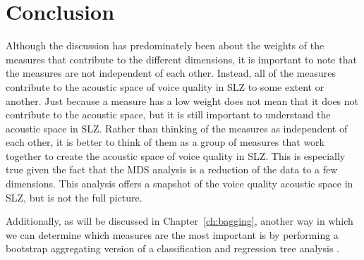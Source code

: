 \section{Conclusion} \label{sec:acousticlandscape:conclusion}

Although the discussion has predominately been about the weights of the measures that contribute to the different dimensions, it is important to note that the measures are not independent of each other. Instead, all of the measures contribute to the acoustic space of voice quality in SLZ to some extent or another. Just because a measure has a low weight does not mean that it does not contribute to the acoustic space, but it is still important to understand the acoustic space in SLZ. Rather than thinking of the measures as independent of each other, it is better to think of them as a group of measures that work together to create the acoustic space of voice quality in SLZ. This is especially true given the fact that the MDS analysis is a reduction of the data to a few dimensions. This analysis offers a snapshot of the voice quality acoustic space in SLZ, but is not the full picture. 

Additionally, as will be discussed in Chapter~\ref{ch:bagging}, another way in which we can determine which measures are the most important is by performing a bootstrap aggregating version of a classification and regression tree analysis \citep{breimanClassificationRegressionTrees1986,breimanBaggingPredictors1996}.